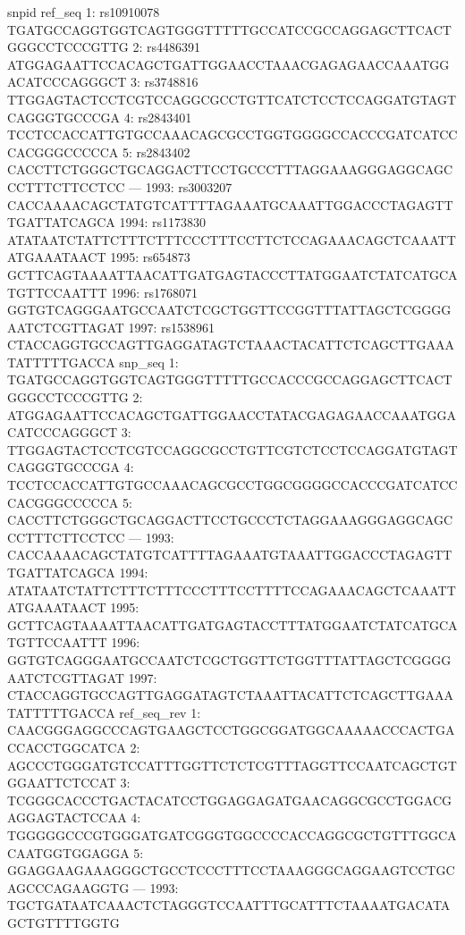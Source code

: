 \documentclass[a4paper,10pt]{article}
\begin{document}
\begin{Schunk}
\begin{Soutput}
           snpid                                                       ref_seq
   1: rs10910078 TGATGCCAGGTGGTCAGTGGGTTTTTGCCATCCGCCAGGAGCTTCACTGGGCCTCCCGTTG
   2:  rs4486391 ATGGAGAATTCCACAGCTGATTGGAACCTAAACGAGAGAACCAAATGGACATCCCAGGGCT
   3:  rs3748816 TTGGAGTACTCCTCGTCCAGGCGCCTGTTCATCTCCTCCAGGATGTAGTCAGGGTGCCCGA
   4:  rs2843401 TCCTCCACCATTGTGCCAAACAGCGCCTGGTGGGGCCACCCGATCATCCCACGGGCCCCCA
   5:  rs2843402 CACCTTCTGGGCTGCAGGACTTCCTGCCCTTTAGGAAAGGGAGGCAGCCCTTTCTTCCTCC
  ---                                                                         
1993:  rs3003207 CACCAAAACAGCTATGTCATTTTAGAAATGCAAATTGGACCCTAGAGTTTGATTATCAGCA
1994:  rs1173830 ATATAATCTATTCTTTCTTTCCCTTTCCTTCTCCAGAAACAGCTCAAATTATGAAATAACT
1995:   rs654873 GCTTCAGTAAAATTAACATTGATGAGTACCCTTATGGAATCTATCATGCATGTTCCAATTT
1996:  rs1768071 GGTGTCAGGGAATGCCAATCTCGCTGGTTCCGGTTTATTAGCTCGGGGAATCTCGTTAGAT
1997:  rs1538961 CTACCAGGTGCCAGTTGAGGATAGTCTAAACTACATTCTCAGCTTGAAATATTTTTGACCA
                                                            snp_seq
   1: TGATGCCAGGTGGTCAGTGGGTTTTTGCCACCCGCCAGGAGCTTCACTGGGCCTCCCGTTG
   2: ATGGAGAATTCCACAGCTGATTGGAACCTATACGAGAGAACCAAATGGACATCCCAGGGCT
   3: TTGGAGTACTCCTCGTCCAGGCGCCTGTTCGTCTCCTCCAGGATGTAGTCAGGGTGCCCGA
   4: TCCTCCACCATTGTGCCAAACAGCGCCTGGCGGGGCCACCCGATCATCCCACGGGCCCCCA
   5: CACCTTCTGGGCTGCAGGACTTCCTGCCCTCTAGGAAAGGGAGGCAGCCCTTTCTTCCTCC
  ---                                                              
1993: CACCAAAACAGCTATGTCATTTTAGAAATGTAAATTGGACCCTAGAGTTTGATTATCAGCA
1994: ATATAATCTATTCTTTCTTTCCCTTTCCTTTTCCAGAAACAGCTCAAATTATGAAATAACT
1995: GCTTCAGTAAAATTAACATTGATGAGTACCTTTATGGAATCTATCATGCATGTTCCAATTT
1996: GGTGTCAGGGAATGCCAATCTCGCTGGTTCTGGTTTATTAGCTCGGGGAATCTCGTTAGAT
1997: CTACCAGGTGCCAGTTGAGGATAGTCTAAATTACATTCTCAGCTTGAAATATTTTTGACCA
                                                        ref_seq_rev
   1: CAACGGGAGGCCCAGTGAAGCTCCTGGCGGATGGCAAAAACCCACTGACCACCTGGCATCA
   2: AGCCCTGGGATGTCCATTTGGTTCTCTCGTTTAGGTTCCAATCAGCTGTGGAATTCTCCAT
   3: TCGGGCACCCTGACTACATCCTGGAGGAGATGAACAGGCGCCTGGACGAGGAGTACTCCAA
   4: TGGGGGCCCGTGGGATGATCGGGTGGCCCCACCAGGCGCTGTTTGGCACAATGGTGGAGGA
   5: GGAGGAAGAAAGGGCTGCCTCCCTTTCCTAAAGGGCAGGAAGTCCTGCAGCCCAGAAGGTG
  ---                                                              
1993: TGCTGATAATCAAACTCTAGGGTCCAATTTGCATTTCTAAAATGACATAGCTGTTTTGGTG

\end{Soutput}
\end{Schunk}
\end{document}
